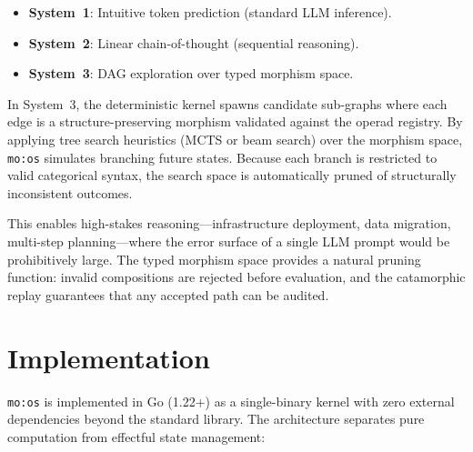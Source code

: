 \documentclass[submission,copyright,creativecommons]{eptcs}
\begin{document}
\begin{itemize}
  \item \textbf{System~1}: Intuitive token prediction (standard LLM inference).
  \item \textbf{System~2}: Linear chain-of-thought (sequential reasoning).
  \item \textbf{System~3}: DAG exploration over typed morphism space.
\end{itemize}

In System~3, the deterministic kernel spawns candidate sub-graphs where each
edge is a structure-preserving morphism validated against the operad registry.
By applying tree search heuristics (MCTS or beam search) over the morphism
space, \texttt{mo:os} simulates branching future states. Because each branch
is restricted to valid categorical syntax, the search space is automatically
pruned of structurally inconsistent outcomes.

This enables high-stakes reasoning---infrastructure deployment, data
migration, multi-step planning---where the error surface of a single LLM
prompt would be prohibitively large. The typed morphism space provides a
natural pruning function: invalid compositions are rejected before evaluation,
and the catamorphic replay guarantees that any accepted path can be audited.

\section{Implementation}
\label{sec:implementation}



\texttt{mo:os} is implemented in Go (1.22+) as a single-binary kernel with
zero external dependencies beyond the standard library. The architecture
separates pure computation from effectful state management:
\end{document}
